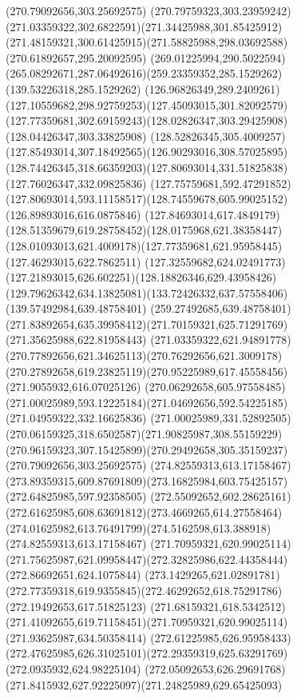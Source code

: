 {{{\moveto(270.79092656,303.25692575)
\curveto(270.79759323,303.23959242)(271.03359322,302.6822591)(271.34425988,301.85425912)
\curveto(271.48159321,300.61425915)(271.58825988,298.03692588)(270.61892657,295.20092595)
\curveto(269.01225994,290.5022594)(265.08292671,287.06492616)(259.23359352,285.1529262)
\lineto(139.53226318,285.1529262)
\curveto(126.96826349,289.2409261)(127.10559682,298.92759253)(127.45093015,301.82092579)
\curveto(127.77359681,302.69159243)(128.02826347,303.29425908)(128.04426347,303.33825908)
\curveto(128.52826345,305.4009257)(127.85493014,307.18492565)(126.90293016,308.57025895)
\curveto(128.74426345,318.66359203)(127.80693014,331.51825838)(127.76026347,332.09825836)
\lineto(127.75759681,592.47291852)
\curveto(127.80693014,593.11158517)(128.74559678,605.99025152)(126.89893016,616.0875846)
\curveto(127.84693014,617.4849179)(128.51359679,619.28758452)(128.0175968,621.38358447)
\curveto(128.01093013,621.4009178)(127.77359681,621.95958445)(127.46293015,622.7862511)
\curveto(127.32559682,624.02491773)(127.21893015,626.602251)(128.18826346,629.43958426)
\curveto(129.79626342,634.13825081)(133.72426332,637.57558406)(139.57492984,639.48758401)
\lineto(259.27492685,639.48758401)
\curveto(271.83892654,635.39958412)(271.70159321,625.71291769)(271.35625988,622.81958443)
\curveto(271.03359322,621.94891778)(270.77892656,621.34625113)(270.76292656,621.3009178)
\curveto(270.27892658,619.23825119)(270.95225989,617.45558456)(271.9055932,616.07025126)
\curveto(270.06292658,605.97558485)(271.00025989,593.12225184)(271.04692656,592.54225185)
\lineto(271.04959322,332.16625836)
\curveto(271.00025989,331.52892505)(270.06159325,318.6502587)(271.90825987,308.55159229)
\curveto(270.96159323,307.15425899)(270.29492658,305.35159237)(270.79092656,303.25692575)
\moveto(274.82559313,613.17158467)
\curveto(273.89359315,609.87691809)(273.16825984,603.75425157)(272.64825985,597.92358505)
\curveto(272.55092652,602.28625161)(272.61625985,608.63691812)(273.4669265,614.27558464)
\curveto(274.01625982,613.76491799)(274.5162598,613.388918)(274.82559313,613.17158467)
\moveto(271.70959321,620.99025114)
\curveto(271.75625987,621.09958447)(272.32825986,622.44358444)(272.86692651,624.1075844)
\lineto(273.1429265,621.02891781)
\curveto(272.77359318,619.9355845)(272.46292652,618.75291786)(272.19492653,617.51825123)
\curveto(271.68159321,618.5342512)(271.41092655,619.71158451)(271.70959321,620.99025114)
\moveto(271.93625987,634.50358414)
\lineto(272.61225985,626.95958433)
\curveto(272.47625985,626.31025101)(272.29359319,625.63291769)(272.0935932,624.98225104)
\curveto(272.05092653,626.29691768)(271.8415932,627.92225097)(271.24825989,629.65425093)
}}}
